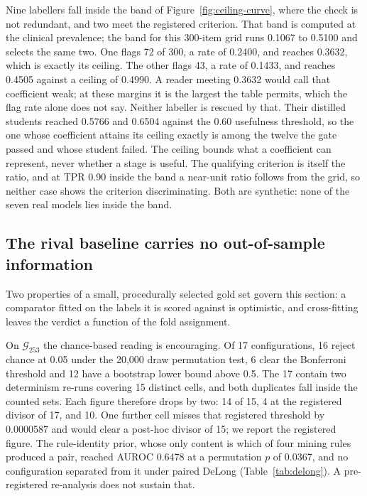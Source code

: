 \documentclass[review]{elsarticle}
\begin{document}
Nine labellers fall inside the band of Figure~\ref{fig:ceiling-curve}, where
the check is not redundant, and two meet the registered criterion. That band is computed at the clinical prevalence; the band for this 300-item
grid runs 0.1067 to 0.5100 and selects the same two. One flags 72 of 300, a rate of 0.2400, and reaches
0.3632, which is exactly its ceiling. The other flags 43, a rate of 0.1433, and
reaches 0.4505 against a ceiling of 0.4990. A reader meeting 0.3632 would call that coefficient weak; at these margins it
is the largest the table permits, which the flag rate alone does not say.
Neither labeller is rescued by that. Their distilled students reached 0.5766
and 0.6504 against the 0.60 usefulness threshold, so the one whose coefficient
attains its ceiling exactly is among the twelve the gate passed and whose
student failed. The ceiling bounds what a coefficient can represent, never whether a stage is
useful. The
qualifying criterion is itself the ratio, and at TPR 0.90 inside the band a
near-unit ratio follows from the grid, so neither case shows the criterion discriminating. Both
are synthetic: none of the seven real models lies inside the band.

\subsection{The rival baseline carries no out-of-sample information}
\label{sec:res-rival}

Two properties of a small, procedurally selected gold set govern this section: a
comparator fitted on the labels it is scored against is optimistic, and
cross-fitting leaves the verdict a function of the fold assignment.

On $\mathcal{G}_{253}$ the chance-based reading is encouraging. Of 17
configurations, 16 reject chance at 0.05 under the 20,000 draw permutation test,
6 clear the Bonferroni threshold and 12 have a bootstrap lower bound above 0.5.
The 17 contain two determinism re-runs covering 15 distinct cells, and both
duplicates fall inside the counted sets. Each figure therefore drops by two:
14 of 15,
4 at the registered divisor of 17, and 10. One further cell misses that
registered threshold by 0.0000587 and would clear a post-hoc divisor of 15; we
report the registered figure. The rule-identity prior, whose only content is which of four mining rules
produced a pair, reached AUROC 0.6478 at a permutation $p$ of 0.0367, and no
configuration separated from it under paired DeLong
(Table~\ref{tab:delong}). A pre-registered re-analysis does not sustain that.
\end{document}
